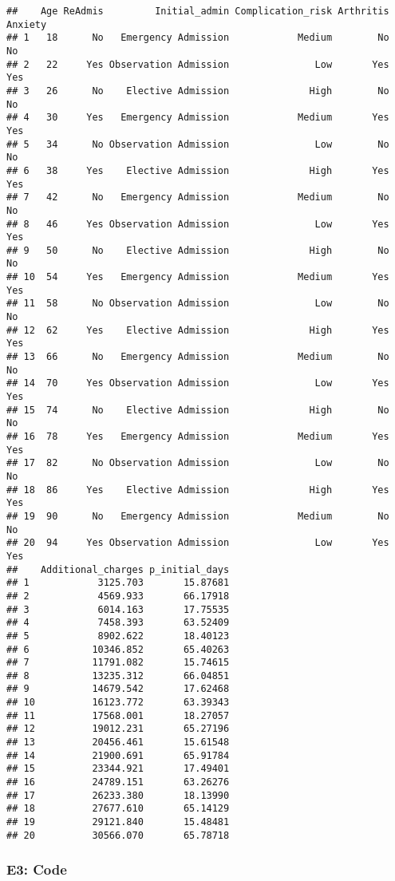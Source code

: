 \documentclass[
]{article}
\begin{document}
\begin{verbatim}
##    Age ReAdmis         Initial_admin Complication_risk Arthritis Anxiety
## 1   18      No   Emergency Admission            Medium        No      No
## 2   22     Yes Observation Admission               Low       Yes     Yes
## 3   26      No    Elective Admission              High        No      No
## 4   30     Yes   Emergency Admission            Medium       Yes     Yes
## 5   34      No Observation Admission               Low        No      No
## 6   38     Yes    Elective Admission              High       Yes     Yes
## 7   42      No   Emergency Admission            Medium        No      No
## 8   46     Yes Observation Admission               Low       Yes     Yes
## 9   50      No    Elective Admission              High        No      No
## 10  54     Yes   Emergency Admission            Medium       Yes     Yes
## 11  58      No Observation Admission               Low        No      No
## 12  62     Yes    Elective Admission              High       Yes     Yes
## 13  66      No   Emergency Admission            Medium        No      No
## 14  70     Yes Observation Admission               Low       Yes     Yes
## 15  74      No    Elective Admission              High        No      No
## 16  78     Yes   Emergency Admission            Medium       Yes     Yes
## 17  82      No Observation Admission               Low        No      No
## 18  86     Yes    Elective Admission              High       Yes     Yes
## 19  90      No   Emergency Admission            Medium        No      No
## 20  94     Yes Observation Admission               Low       Yes     Yes
##    Additional_charges p_initial_days
## 1            3125.703       15.87681
## 2            4569.933       66.17918
## 3            6014.163       17.75535
## 4            7458.393       63.52409
## 5            8902.622       18.40123
## 6           10346.852       65.40263
## 7           11791.082       15.74615
## 8           13235.312       66.04851
## 9           14679.542       17.62468
## 10          16123.772       63.39343
## 11          17568.001       18.27057
## 12          19012.231       65.27196
## 13          20456.461       15.61548
## 14          21900.691       65.91784
## 15          23344.921       17.49401
## 16          24789.151       63.26276
## 17          26233.380       18.13990
## 18          27677.610       65.14129
## 19          29121.840       15.48481
## 20          30566.070       65.78718
\end{verbatim}

\hypertarget{e3-code}{%
\subsubsection{E3: Code}\label{e3-code}}
\end{document}
